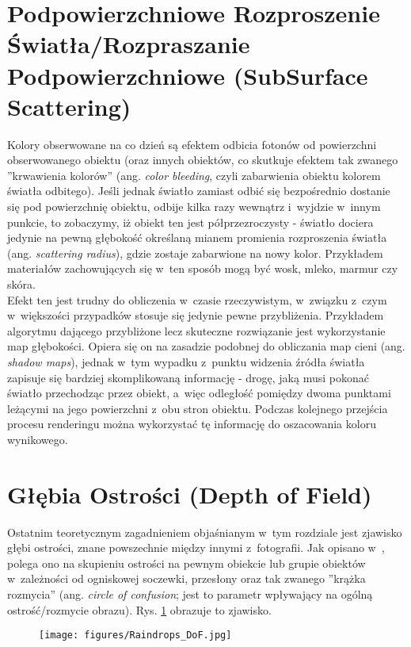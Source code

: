 \section{Podpowierzchniowe Rozproszenie Światła/Rozpraszanie Podpowierzchniowe (SubSurface Scattering)}

Kolory obserwowane na co dzień są efektem odbicia fotonów od powierzchni obserwowanego obiektu (oraz innych obiektów, co skutkuje efektem tak zwanego ''krwawienia kolorów'' (ang. \emph{color bleeding}, czyli zabarwienia obiektu kolorem światła odbitego). Jeśli jednak światło zamiast odbić się bezpośrednio dostanie się pod powierzchnię obiektu, odbije kilka razy wewnątrz i~wyjdzie w~innym punkcie, to zobaczymy, iż obiekt ten jest półprzezroczysty - światło dociera jedynie na pewną głębokość określaną mianem promienia rozproszenia światła (ang. \emph{scattering radius}), gdzie zostaje zabarwione na nowy kolor. Przykładem materiałów zachowujących się w~ten sposób mogą być wosk, mleko, marmur czy skóra.\\
Efekt ten jest trudny do obliczenia w~czasie rzeczywistym, w~związku z~czym w~większości przypadków stosuje się jedynie pewne przybliżenia. Przykładem algorytmu dającego przybliżone lecz skuteczne rozwiązanie jest wykorzystanie map głębokości. Opiera się on na zasadzie podobnej do obliczania map cieni (ang. \emph{shadow maps}), jednak w~tym wypadku z~punktu widzenia źródła światła zapisuje się bardziej skomplikowaną informację - drogę, jaką musi pokonać światło przechodząc przez obiekt, a~więc odległość pomiędzy dwoma punktami leżącymi na jego powierzchni z~obu stron obiektu. Podczas kolejnego przejścia procesu renderingu można wykorzystać tę informację do oszacowania koloru wynikowego.

\section{Głębia Ostrości (Depth of Field)}

Ostatnim teoretycznym zagadnieniem objaśnianym w~tym rozdziale jest zjawisko głębi ostrości, znane powszechnie między innymi z~fotografii. Jak opisano w~\cite{gpugems_23}, polega ono na skupieniu ostrości na pewnym obiekcie lub grupie obiektów w~zależności od ogniskowej soczewki, przesłony oraz tak zwanego ''krążka rozmycia'' (ang. \emph{circle of confusion}; jest to parametr wpływający na ogólną ostrość/rozmycie obrazu). Rys. \ref{DoF_example_rain} obrazuje to zjawisko.

\begin{figure}
\begin{center}
\texttt{[image: figures/Raindrops\_DoF.jpg]}
\label{DoF_example_rain}
\end{center}
\end{figure}